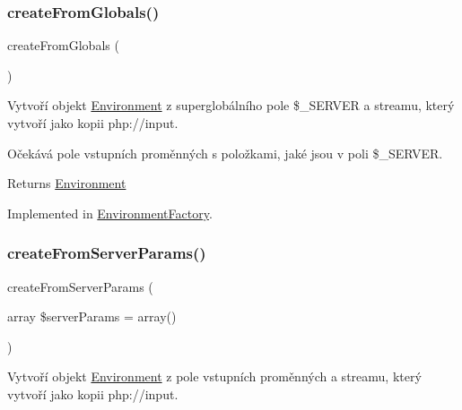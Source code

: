 \subsubsection{\texorpdfstring{create\+From\+Globals()}{createFromGlobals()}}
{\footnotesize\ttfamily create\+From\+Globals (\begin{DoxyParamCaption}{ }\end{DoxyParamCaption})}

Vytvoří objekt \mbox{\hyperlink{class_pes_1_1_http_1_1_environment}{Environment}} z superglobálního pole \$\+\_\+\+S\+E\+R\+V\+ER a streamu, který vytvoří jako kopii php\+://input.

Očekává pole vstupních proměnných s položkami, jaké jsou v poli \$\+\_\+\+S\+E\+R\+V\+ER.

\begin{DoxyReturn}{Returns}
\mbox{\hyperlink{class_pes_1_1_http_1_1_environment}{Environment}} 
\end{DoxyReturn}


Implemented in \mbox{\hyperlink{class_pes_1_1_http_1_1_factory_1_1_environment_factory_a0c9fd6ecd2d19d53bdbaa89c08428564}{Environment\+Factory}}.

\mbox{\label{interface_pes_1_1_http_1_1_factory_1_1_environment_factory_interface_aaf064f4cfd8fa6ba2e87755aa7f03b26}} 
\subsubsection{\texorpdfstring{create\+From\+Server\+Params()}{createFromServerParams()}}
{\footnotesize\ttfamily create\+From\+Server\+Params (\begin{DoxyParamCaption}\item[{array}]{\$server\+Params = {\ttfamily array()} }\end{DoxyParamCaption})}

Vytvoří objekt \mbox{\hyperlink{class_pes_1_1_http_1_1_environment}{Environment}} z pole vstupních proměnných a streamu, který vytvoří jako kopii php\+://input.

